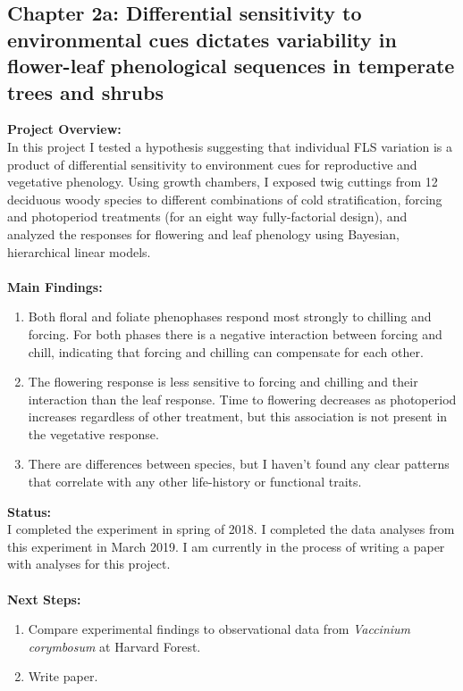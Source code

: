 \documentclass[11pt]{article}\usepackage[]{graphicx}\usepackage[]{color}
\begin{document}
\subsection*{Chapter 2a: Differential sensitivity to environmental cues dictates variability in flower-leaf phenological sequences in temperate trees and shrubs}
\textbf{Project Overview:}\\
\indent In this project I tested a hypothesis suggesting that individual FLS variation is a product of differential sensitivity to environment cues for reproductive and vegetative phenology. Using growth chambers, I exposed twig cuttings from 12 deciduous woody species to different combinations of cold stratification, forcing and photoperiod treatments (for an eight way fully-factorial design), and analyzed the responses for flowering and leaf phenology using Bayesian, hierarchical linear models.\\
\\
\textbf{Main Findings:}
\begin{enumerate}
\item Both floral and foliate phenophases respond most strongly to chilling and forcing. For both phases there is a negative interaction between forcing and chill, indicating that forcing and chilling can compensate for each other.
\item The flowering response is less sensitive to forcing and chilling and their interaction than the leaf response. Time to flowering decreases as photoperiod increases regardless of other treatment, but this association is not present in the vegetative response.
\item There are differences between species, but I haven't found any clear patterns that correlate with any other life-history or functional traits.
\end{enumerate}

\textbf{Status:}\\
\indent I completed the experiment in spring of 2018. I completed the data analyses from this experiment in March 2019. I am currently in the process of writing a paper with analyses for this project.\\
\\
\textbf{Next Steps:}
\begin{enumerate}
\item Compare experimental findings to observational data from \textit{Vaccinium corymbosum} at Harvard Forest.
\item Write paper.
\end{enumerate}
\end{document}
